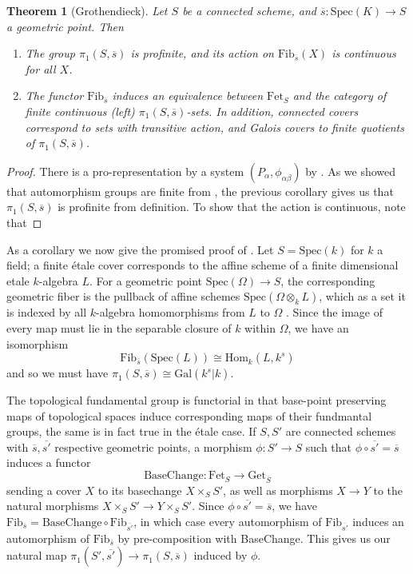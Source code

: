 \documentclass{article}
\newtheorem{theorem}{Theorem}[section]
\theoremstyle{definition}
\theoremstyle{remark}
\begin{document}
\begin{theorem}[Grothendieck]
	Let $S$ be a connected scheme, and $\overline{s}: \text{Spec}(K) \to S$ a geometric point. Then \begin{enumerate} 
		\item The group $\pi_1(S, \overline{s})$ is profinite, and its action on $\text{Fib}_{\overline{s}}(X)$ is continuous for all $X$.
		\item The functor $\text{Fib}_{\overline{s}}$ induces an equivalence between $\text{Fet}_S$ and the category of finite continuous (left) $\pi_1(S, \overline{s})$-sets.	In addition, connected covers correspond to sets with transitive action, and Galois covers to finite quotients of $\pi_1(S, \overline{s})$.
 \end{enumerate} 
\end{theorem}

\begin{proof}
	There is a pro-representation by a system $(P_{\alpha}, \phi_{\alpha \beta})$  by .
	As we showed that automorphism groups are finite from , the previous corollary gives us that $\pi_1(S, \overline{s})$ is profinite from definition.
To show that the action is continuous, note that  
\end{proof}

As a corollary we now give the promised proof of .
Let $S = \text{Spec}(k)$ for $k$ a field; a finite \'etale cover corresponds to the affine scheme of a finite dimensional \;etale $k$-algebra $L$.
For a geometric point $\text{Spec}(\Omega) \to S$, the corresponding geometric fiber is the pullback of affine schemes $\text{Spec}(\Omega \otimes_k L)$, which as a set it is indexed by all $k$-algebra homomorphisms from $L$ to $\Omega$ .
Since the image of every map must lie in the separable closure of $k$ within $\Omega$, we have an isomorphism 
\[\text{Fib}_{\overline{s}}(\text{Spec}(L)) \cong \text{Hom}_k(L, k^s)\]
and so we must have $\pi_1(S, \overline{s}) \cong \text{Gal}(k^s|k)$.

The topological fundamental group is functorial in that base-point preserving maps of topological spaces induce corresponding maps of their fundmantal groups, the same is in fact true in the \'etale case.
If $S, S'$ are connected schemes with $\overline{s}, \overline{s'}$ respective geometric points, a morphism $\phi: S' \to S$ such that $\phi \circ \overline{s'} = \overline{s}$ induces a functor
\[\text{BaseChange}: \text{Fet}_S \to \text{Get}_{\overline{S}}\]
sending a cover $X$ to its basechange $X \times_S S'$, as well as morphisms $X \to Y$ to the natural morphisms $X \times_S S' \to Y \times_S S'$.
Since $\phi \circ \overline{s'} = \overline{s}$, we have $\text{Fib}_{\overline{s}} = \text{BaseChange} \circ \text{Fib}_{\overline{s'}}$, in which case every automorphism of $\text{Fib}_{\overline{s'}}$ induces an automorphism of $\text{Fib}_{\overline{s}}$ by pre-composition with BaseChange.
This gives us our natural map $\pi_1(S', \overline{s'}) \to \pi_1(S, \overline{s})$ induced by $\phi$.
\end{document}
